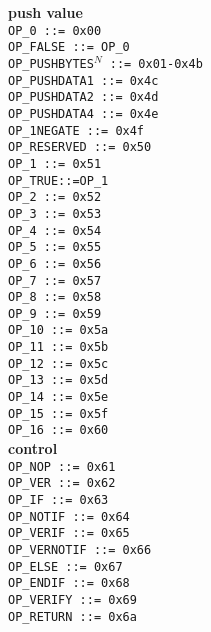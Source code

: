 \documentclass{article}
\begin{document}
\begin{multicols}{3}

\textbf{\centering push value} \\
\texttt{OP\_0 ::= 0x00  } \\
\texttt{OP\_FALSE ::= OP\_0  } \\
\texttt{{OP\_PUSHBYTES$^N$} ::= 0x01-0x4b} \\
\texttt{OP\_PUSHDATA1 ::= 0x4c  } \\
\texttt{OP\_PUSHDATA2 ::= 0x4d  } \\
\texttt{OP\_PUSHDATA4 ::= 0x4e  } \\
\texttt{OP\_1NEGATE ::= 0x4f  } \\
\texttt{OP\_RESERVED ::= 0x50  } \\
\texttt{OP\_1 ::= 0x51  } \\
\texttt{OP\_TRUE::=OP\_1  } \\
\texttt{OP\_2 ::= 0x52  } \\
\texttt{OP\_3 ::= 0x53  } \\
\texttt{OP\_4 ::= 0x54  } \\
\texttt{OP\_5 ::= 0x55  } \\
\texttt{OP\_6 ::= 0x56  } \\
\texttt{OP\_7 ::= 0x57  } \\
\texttt{OP\_8 ::= 0x58  } \\
\texttt{OP\_9 ::= 0x59  } \\
\texttt{OP\_10 ::= 0x5a  } \\
\texttt{OP\_11 ::= 0x5b  } \\
\texttt{OP\_12 ::= 0x5c  } \\
\texttt{OP\_13 ::= 0x5d  } \\
\texttt{OP\_14 ::= 0x5e  } \\
\texttt{OP\_15 ::= 0x5f  } \\
\texttt{OP\_16 ::= 0x60  } \\

\textbf{\centering control} \\
\texttt{OP\_NOP ::= 0x61  } \\
\texttt{OP\_VER ::= 0x62  } \\
\texttt{OP\_IF ::= 0x63  } \\
\texttt{OP\_NOTIF ::= 0x64  } \\
\texttt{OP\_VERIF ::= 0x65  } \\
\texttt{OP\_VERNOTIF ::= 0x66  } \\
\texttt{OP\_ELSE ::= 0x67  } \\
\texttt{OP\_ENDIF ::= 0x68  } \\
\texttt{OP\_VERIFY ::= 0x69  } \\
\texttt{OP\_RETURN ::= 0x6a  } \\


\end{multicols}
\end{document}
